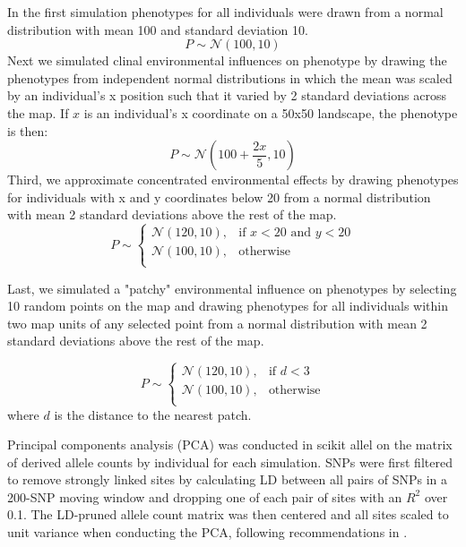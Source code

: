 \documentclass[11pt,twoside,lineno]{preprint}
\begin{document}
In the first simulation phenotypes for all individuals were drawn from a normal distribution with mean 100 and standard deviation 10.
\begin{equation}
    P \sim \mathcal{N}(100,10)
\end{equation}
Next we simulated clinal environmental influences on phenotype by drawing the phenotypes from independent normal distributions in which the mean was scaled by an individual's x position such that it varied by 2 standard deviations across the map. If $x$ is an individual's x coordinate on a 50x50 landscape, the phenotype is then:
\begin{equation}
    P \sim \mathcal{N}(100+\frac{2x}{5},10)
\end{equation}
Third, we approximate concentrated environmental effects by drawing phenotypes for individuals with x and y coordinates below 20 from a normal distribution with mean 2 standard deviations above the rest of the map. 
\begin{equation}
    P\sim
\begin{cases}
    \mathcal{N}(120,10),& \text{if } x< 20 \text{ and } y<20\\
    \mathcal{N}(100,10),& \text{otherwise}\\
\end{cases}
\end{equation}

Last, we simulated a "patchy" environmental influence on phenotypes by selecting 10 random points on the map and drawing phenotypes for all individuals within two map units of any selected point from a normal distribution with mean 2 standard deviations above the rest of the map. 

\begin{equation}
    P\sim
\begin{cases}
    \mathcal{N}(120,10),& \text{if } d < 3\\
    \mathcal{N}(100,10),& \text{otherwise}\\
\end{cases}
\end{equation}
where $d$ is the distance to the nearest patch. 

Principal components analysis (PCA) was conducted in scikit allel on the matrix of derived allele counts by individual for each simulation. SNPs were first filtered to remove strongly linked sites by calculating LD between all pairs of SNPs in a 200-SNP moving window and dropping one of each pair of sites with an $R^2$ over 0.1. The LD-pruned allele count matrix was then centered and all sites scaled to unit variance when conducting the PCA, following recommendations in \citep{Patterson2006}.   
\end{document}
